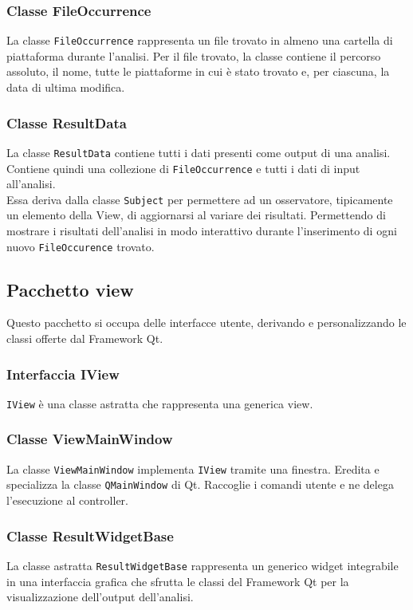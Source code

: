		\subsubsection{Classe FileOccurrence}
			La classe \texttt{FileOccurrence} rappresenta un file trovato in almeno una cartella di piattaforma durante l'analisi. Per il file trovato, la classe contiene il percorso assoluto, il nome, tutte le piattaforme in cui è stato trovato e, per ciascuna, la data di ultima modifica. 
				
		\subsubsection{Classe ResultData}
			La classe \texttt{ResultData} contiene tutti i dati presenti come output di una analisi. Contiene quindi una collezione di \texttt{FileOccurrence} e tutti i dati di input all'analisi.\\
			Essa deriva dalla classe \texttt{Subject} per permettere ad un osservatore, tipicamente un elemento della View, di aggiornarsi al variare dei risultati. Permettendo di mostrare i risultati dell'analisi in modo interattivo durante l'inserimento di ogni nuovo \texttt{FileOccurence} trovato.
			
	\subsection{Pacchetto view}
		Questo pacchetto si occupa delle interfacce utente, derivando e personalizzando le classi offerte dal Framework Qt\textsuperscript{\textregistered}.
		
		\subsubsection{Interfaccia IView}
			\texttt{IView} è una classe astratta che rappresenta una generica view.
			
		\subsubsection{Classe ViewMainWindow}
			La classe \texttt{ViewMainWindow} implementa \texttt{IView} tramite una finestra. Eredita e specializza la classe \texttt{QMainWindow} di Qt\textsuperscript{\textregistered}. Raccoglie i comandi utente e ne delega l'esecuzione al controller.
			
		\subsubsection{Classe ResultWidgetBase}
			La classe astratta \texttt{ResultWidgetBase} rappresenta un generico widget integrabile in una interfaccia grafica che sfrutta le classi del Framework Qt\textsuperscript{\textregistered} per la visualizzazione dell'output dell'analisi.
			
